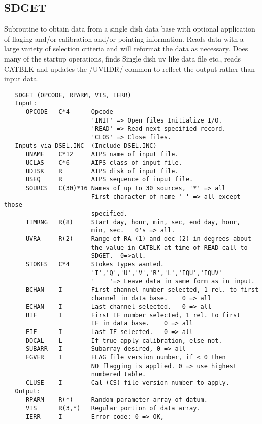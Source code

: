 \subsection{SDGET}
Subroutine to obtain data from a single dish data base with
optional application of flaging and/or calibration and/or pointing
information.  Reads data with a large variety of selection criteria
and will reformat the data as necessary.  Does many of the startup
operations, finds Single dish uv like data file etc., reads CATBLK
and updates the /UVHDR/ common to reflect the output rather than
input data.
\begin{verbatim}
   SDGET (OPCODE, RPARM, VIS, IERR)
   Input:
      OPCODE   C*4      Opcode -
                        'INIT' => Open files Initialize I/O.
                        'READ' => Read next specified record.
                        'CLOS' => Close files.
   Inputs via DSEL.INC  (Include DSEL.INC)
      UNAME    C*12     AIPS name of input file.
      UCLAS    C*6      AIPS class of input file.
      UDISK    R        AIPS disk of input file.
      USEQ     R        AIPS sequence of input file.
      SOURCS   C(30)*16 Names of up to 30 sources, '*' => all
                        First character of name '-' => all except those
                        specified.
      TIMRNG   R(8)     Start day, hour, min, sec, end day, hour,
                        min, sec.   0's => all.
      UVRA     R(2)     Range of RA (1) and dec (2) in degrees about
                        the value in CATBLK at time of READ call to
                        SDGET.  0=>all.
      STOKES   C*4      Stokes types wanted.
                        'I','Q','U','V','R','L','IQU','IQUV'
                        '    '=> Leave data in same form as in input.
      BCHAN    I        First channel number selected, 1 rel. to first
                        channel in data base.    0 => all
      ECHAN    I        Last channel selected.   0 => all
      BIF      I        First IF number selected, 1 rel. to first
                        IF in data base.    0 => all
      EIF      I        Last IF selected.   0 => all
      DOCAL    L        If true apply calibration, else not.
      SUBARR   I        Subarray desired, 0 => all
      FGVER    I        FLAG file version number, if < 0 then
                        NO flagging is applied. 0 => use highest
                        numbered table.
      CLUSE    I        Cal (CS) file version number to apply.
   Output:
      RPARM    R(*)     Random parameter array of datum.
      VIS      R(3,*)   Regular portion of data array.
      IERR     I        Error code: 0 => OK,

\end{verbatim}
